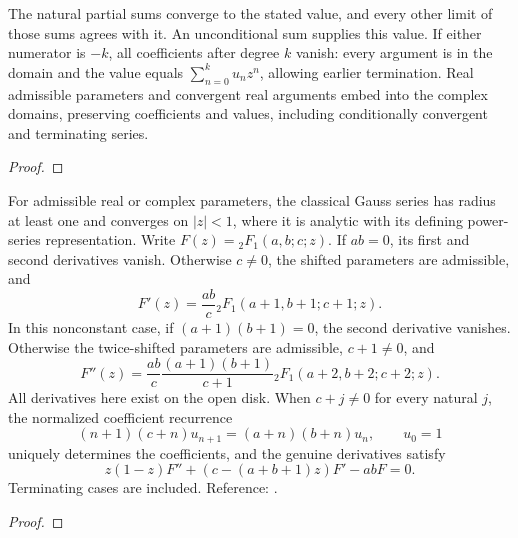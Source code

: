 \begin{theorem}
\label{thm:ordinary-hypergeometric}
\leanok
The natural partial sums converge to the stated value, and every other limit of
those sums agrees with it. An unconditional sum supplies this value. If either
numerator is $-k$, all coefficients after degree $k$ vanish: every argument is in
the domain and the value equals $\sum_{n=0}^{k}u_nz^n$, allowing earlier termination.
Real admissible parameters and convergent real arguments embed into the complex
domains, preserving coefficients and values, including conditionally convergent
and terminating series.
\end{theorem}
\begin{proof}
\leanok
\end{proof}

\begin{theorem}
\label{thm:hypergeometric-calculus}
\leanok
For admissible real or complex parameters, the classical Gauss series has radius
at least one and converges on $|z|<1$, where it is analytic with its defining
power-series representation. Write $F(z)={}_2F_1(a,b;c;z)$.
If $ab=0$, its first and second derivatives vanish. Otherwise $c\ne0$, the
shifted parameters are admissible, and
\[
 F'(z)=\frac{ab}{c}{}_2F_1(a+1,b+1;c+1;z).
\]
In this nonconstant case, if $(a+1)(b+1)=0$, the second derivative vanishes.
Otherwise the twice-shifted
parameters are admissible, $c+1\ne0$, and
\[
 F''(z)=\frac{ab}{c}\frac{(a+1)(b+1)}{c+1}
 {}_2F_1(a+2,b+2;c+2;z).
\]
All derivatives here exist on the open disk. When $c+j\ne0$ for every natural
$j$, the normalized coefficient recurrence
\[
 (n+1)(c+n)u_{n+1}=(a+n)(b+n)u_n,\qquad u_0=1
\]
uniquely determines the coefficients, and the genuine derivatives satisfy
\[
 z(1-z)F''+(c-(a+b+1)z)F'-abF=0.
\]
Terminating cases are included.
Reference: \cite[15.2.1, 15.5.1, 15.10.1]{dlmf}.
\end{theorem}
\begin{proof}
\leanok
\end{proof}

